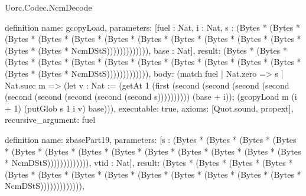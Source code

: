 \begin{lexlean}{Uorc.Codec.NcmDecode}
\begin{semanticmodule}
definition{
  name: gcopyLoad,
  parameters: [fuel : Nat, i : Nat, s : (Bytes * (Bytes * (Bytes * (Bytes * (Bytes * (Bytes * (Bytes * (Bytes * (Bytes * (Bytes * (Bytes * (Bytes * (Bytes * NcmDStS))))))))))))), base : Nat],
  result: (Bytes * (Bytes * (Bytes * (Bytes * (Bytes * (Bytes * (Bytes * (Bytes * (Bytes * (Bytes * (Bytes * (Bytes * (Bytes * NcmDStS))))))))))))),
  body: (match fuel
    | Nat.zero => s
    | Nat.succ m => (let v : Nat := (getAt 1 (first (second (second (second (second (second (second (second (second (second s)))))))))) (base + i)); (gcopyLoad m (i + 1) (putGlob s 1 i v) base))),
  executable: true,
  axioms: [Quot.sound, propext],
  recursive_argument: fuel
}

definition{
  name: zbasePart19,
  parameters: [s : (Bytes * (Bytes * (Bytes * (Bytes * (Bytes * (Bytes * (Bytes * (Bytes * (Bytes * (Bytes * (Bytes * (Bytes * (Bytes * NcmDStS))))))))))))), vtid : Nat],
  result: (Bytes * (Bytes * (Bytes * (Bytes * (Bytes * (Bytes * (Bytes * (Bytes * (Bytes * (Bytes * (Bytes * (Bytes * (Bytes * NcmDStS))))))))))))),
}
\end{semanticmodule}
\end{lexlean}
